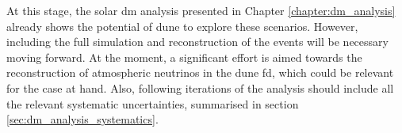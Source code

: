 \begin{comment}
The solar \gls{dm} analysis is covered in Chapter \ref{chapter:dm_analysis}. There I explain how the \gls{dune} \gls{fd} can be used to probe \gls{dm} interactions by measuring the neutrino flux coming from \gls{dm} annihilations in the core of the Sun. After introducing the topic of \gls{dm} capture and annihilation in a massive object like the Sun, I describe what kind of neutrino signals one can expect from such events in section \ref{sec:dm_analysis_flux}. Later, I comment on how \gls{dune} could constrain the \gls{dm} parameter space by performing counting experiments. In section \ref{sec:dm_analysis_high_e_nu} I study the selection efficiency for the $\tau^{+}\tau^{-}$ and $b\bar{b}$ channels. I focus on two different kinematic regimes: the high energy neutrinos where \gls{dis} interactions with argon dominate, and the low energy part of the spectrum where neutrinos mainly undergo QEL interactions. This allows me to compute the projected generator-level \gls{dm} cross section sensitivities, showing how \gls{dune} can be complementary to other indirect \gls{dm} searches. Additionally, I explore two specific realisations of the \gls{dm} interactions, namely Kaluza-Klein and leptophilic \gls{dm}.

At this stage, this analysis already shows the potential of \gls{dune} to explore these scenarios. However, including the full simulation and reconstruction of the events will be necessary moving forward. At the moment, a significant effort is aimed towards the reconstruction of atmospheric neutrinos in the \gls{dune} \gls{fd}, which could be relevant for the case at hand. Also, following iterations of the analysis should include all the relevant systematic uncertainties. A summary of these is presented in section \ref{sec:dm_analysis_systematics}.
\end{comment}

At this stage, the solar \gls{dm} analysis presented in Chapter \ref{chapter:dm_analysis} already shows the potential of \gls{dune} to explore these scenarios. However, including the full simulation and reconstruction of the events will be necessary moving forward. At the moment, a significant effort is aimed towards the reconstruction of atmospheric neutrinos in the \gls{dune} \gls{fd}, which could be relevant for the case at hand. Also, following iterations of the analysis should include all the relevant systematic uncertainties, summarised in section \ref{sec:dm_analysis_systematics}.

